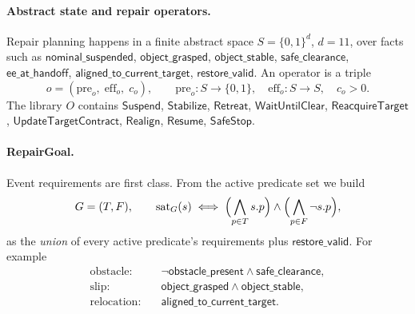 \documentclass[11pt]{article}
\begin{document}
\paragraph{Abstract state and repair operators.}
Repair planning happens in a finite abstract space
$S=\{0,1\}^{d}$, $d=11$, over facts such as
$\textsf{nominal\_suspended}$, $\textsf{object\_grasped}$,
$\textsf{object\_stable}$, $\textsf{safe\_clearance}$,
$\textsf{ee\_at\_handoff}$, $\textsf{aligned\_to\_current\_target}$,
$\textsf{restore\_valid}$. An operator is a triple
\begin{equation}
o=(\mathrm{pre}_o,\;\mathrm{eff}_o,\;c_o),\qquad
\mathrm{pre}_o:S\to\{0,1\},\quad \mathrm{eff}_o:S\to S,\quad c_o>0 .
\end{equation}
The library $O$ contains $\textsf{Suspend}$, $\textsf{Stabilize}$,
$\textsf{Retreat}$, $\textsf{WaitUntilClear}$, $\textsf{ReacquireTarget}$,
$\textsf{UpdateTargetContract}$, $\textsf{Realign}$, $\textsf{Resume}$,
$\textsf{SafeStop}$.

\paragraph{RepairGoal.}
Event requirements are first class. From the active predicate set we build
\begin{equation}
G=(T,F),\qquad
\mathrm{sat}_G(s)\iff
\Bigl(\bigwedge_{p\in T}s.p\Bigr)\wedge\Bigl(\bigwedge_{p\in F}\neg s.p\Bigr),
\end{equation}
as the \emph{union} of every active predicate's requirements plus
$\textsf{restore\_valid}$. For example
\begin{align}
\text{obstacle:}\quad & \neg\textsf{obstacle\_present}\wedge\textsf{safe\_clearance},\\
\text{slip:}\quad & \textsf{object\_grasped}\wedge\textsf{object\_stable},\\
\text{relocation:}\quad & \textsf{aligned\_to\_current\_target}.
\end{align}
\end{document}

